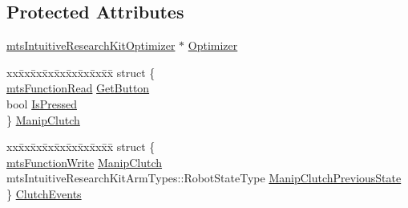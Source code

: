 \subsection*{Protected Attributes}
\begin{DoxyCompactItemize}
\item 
\hyperlink{classmts_intuitive_research_kit_optimizer}{mts\+Intuitive\+Research\+Kit\+Optimizer} $\ast$ \hyperlink{classmts_intuitive_research_kit_p_s_m_a3ca72df1e884e0d754b6ac688f0715f0}{Optimizer}
\item 
\begin{tabbing}
xx\=xx\=xx\=xx\=xx\=xx\=xx\=xx\=xx\=\kill
struct \{\\
\>\hyperlink{classmts_function_read}{mtsFunctionRead} \hyperlink{classmts_intuitive_research_kit_p_s_m_aa4f1aaa075c8c71a96ddcba9336d0e0a}{GetButton}\\
\>bool \hyperlink{classmts_intuitive_research_kit_p_s_m_a78a247dc70ea5b9a26a2bd40be409e16}{IsPressed}\\
\} \hyperlink{classmts_intuitive_research_kit_p_s_m_a09f7283ab509a7f2b719ccefb7a3a184}{ManipClutch}\\

\end{tabbing}\item 
\begin{tabbing}
xx\=xx\=xx\=xx\=xx\=xx\=xx\=xx\=xx\=\kill
struct \{\\
\>\hyperlink{classmts_function_write}{mtsFunctionWrite} \hyperlink{classmts_intuitive_research_kit_p_s_m_a02491aec085bb8e079ea0ec2dc11b278}{ManipClutch}\\
\>mtsIntuitiveResearchKitArmTypes::RobotStateType \hyperlink{classmts_intuitive_research_kit_p_s_m_ab4a9f5daf47990c0b59c433775aba897}{ManipClutchPreviousState}\\
\} \hyperlink{classmts_intuitive_research_kit_p_s_m_a549f1a1195917fa45794b543c872febe}{ClutchEvents}\\


\end{tabbing}
\end{DoxyCompactItemize}

